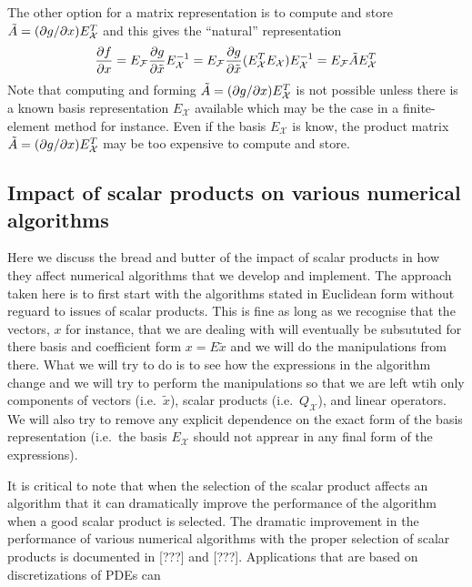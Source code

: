 The other option for a matrix representation is to compute and store
$\tilde{A} = (\partial g / \partial x) E_{\mathcal{X}}^T$ and this gives the ``natural''
representation
%
\begin{equation}
\displaystyle{\frac{\partial f}{\partial x}} = E_{\mathcal{F}} \displaystyle{\frac{\partial g}{\partial \tilde{x}}} E_{\mathcal{X}}^{-1}
= E_{\mathcal{F}} \displaystyle{\frac{\partial g}{\partial \tilde{x}}} ( E_{\mathcal{X}}^T E_{\mathcal{X}} ) E_{\mathcal{X}}^{-1}
= E_{\mathcal{F}} \tilde{A} E_{\mathcal{X}}^T
\label{eqn:d_f_d_x_natural_rep}
\end{equation}
%
Note that computing and forming $\tilde{A} = (\partial g / \partial x) E_{\mathcal{X}}^T$
is not possible unless there is a known basis representation $E_{\mathcal{X}}$
available which may be the case in a finite-element method for instance.  Even
if the basis $E_{\mathcal{X}}$ is know, the product matrix $\tilde{A} =
(\partial g / \partial x) E_{\mathcal{X}}^T$ may be too expensive to compute and store.

\subsection{Impact of scalar products on various numerical algorithms}

Here we discuss the bread and butter of the impact of scalar products in how
they affect numerical algorithms that we develop and implement.  The approach
taken here is to first start with the algorithms stated in Euclidean form
without reguard to issues of scalar products.  This is fine as long as we
recognise that the vectors, $x$ for instance, that we are dealing with will
eventually be subsututed for there basis and coefficient form $x = E\tilde{x}$
and we will do the manipulations from there.  What we will try to do is to see
how the expressions in the algorithm change and we will try to perform the
manipulations so that we are left wtih only components of vectors (i.e.\
$\tilde{x}$), scalar products (i.e.\ $Q_{\mathcal{X}}$), and linear operators.
We will also try to remove any explicit dependence on the exact form of the
basis representation (i.e.\ the basis $E_{\mathcal{X}}$ should not apprear in
any final form of the expressions).

It is critical to note that when the selection of the scalar product affects
an algorithm that it can dramatically improve the performance of the algorithm
when a good scalar product is selected.  The dramatic improvement in the
performance of various numerical algorithms with the proper selection of
scalar products is documented in [???] and [???].  Applications that are based
on discretizations of PDEs can 

